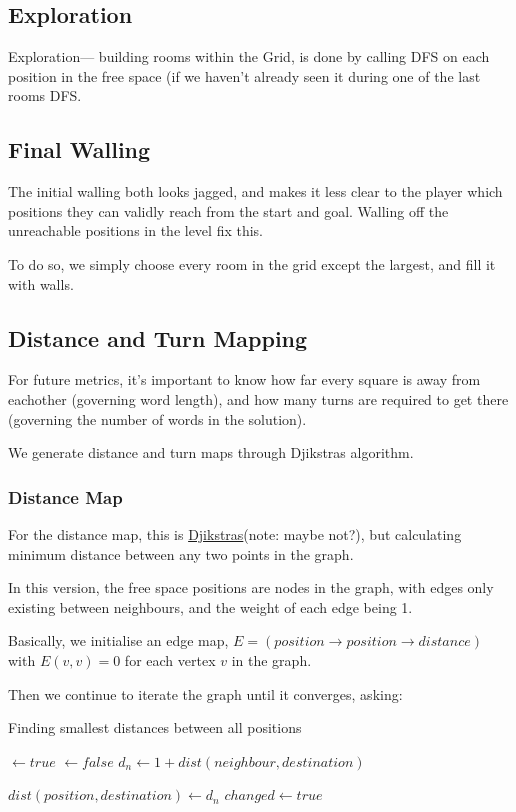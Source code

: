 \documentclass{article}
\begin{document}
\subsection{Exploration}
Exploration--- building rooms within the Grid, is done by calling DFS on each
position in the free space (if we haven't already seen it during one of the last
rooms DFS.

\subsection{Final Walling}
The initial walling both looks jagged, and makes it less clear to the player 
which positions they can validly reach from the start and goal. Walling off the 
unreachable positions in the level fix this.

To do so, we simply choose every room in the grid except the largest, 
and fill it with walls.

\subsection{Distance and Turn Mapping}
For future metrics, it's important to know how far every square is away from 
eachother (governing word length), and how many turns are required to get there 
(governing the number of words in the solution). 

We generate distance and turn maps through Djikstras algorithm.

\subsubsection{Distance Map}
For the distance map, this is 
\href{https://en.wikipedia.org/wiki/Dijkstra%27s_algorithm}{Djikstras}(note: maybe not?),
but calculating minimum distance between any two points in the graph.

In this version, the free space positions are nodes in the graph, with
edges only existing between neighbours, 
and the weight of each edge being 1.

Basically, we initialise an edge map, $E=(position \rightarrow position \rightarrow distance)$
with $E(v, v) = 0$ for each vertex $v$ in the graph.

Then we continue to iterate the graph until it converges, asking:
\begin{algorithm}
\caption{Finding smallest distances between all positions}\label{alg:distance-map}
\begin{algorithmic}
 $\gets true$
   $\gets false$
          \State $d_n \gets 1 + dist(neighbour, destination)$

          \State $dist(position, destination) \gets d_n$
          \State $changed \gets true$
        \EndIf
    \EndFor
  \EndFor
  \EndFor
\EndWhile
\end{algorithmic}
\end{algorithm}
\end{document}
